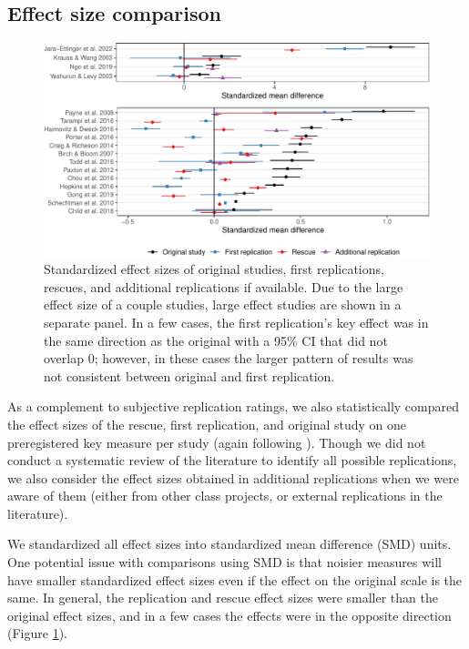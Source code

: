 \documentclass[
  english,
  a4paper,
]{article}
\begin{document}
\subsection{Effect size comparison}\label{effect-size-comparison}

\begin{figure}
\includegraphics[width=1\linewidth]{manuscript_files/figure-latex/smd-1} \caption{Standardized effect sizes of original studies, first replications, rescues, and additional replications if available. Due to the large effect size of a couple studies, large effect studies are shown in a separate panel. In a few cases, the first replication's key effect was in the same direction as the original with a 95\% CI that did not overlap 0; however, in these cases the larger pattern of results was not consistent between original and first replication.  }\label{fig:smd}
\end{figure}

As a complement to subjective replication ratings, we also statistically compared the effect sizes of the rescue, first replication, and original study on one preregistered key measure per study (again following ).
Though we did not conduct a systematic review of the literature to identify all possible replications, we also consider the effect sizes obtained in additional replications when we were aware of them (either from other class projects, or external replications in the literature).

We standardized all effect sizes into standardized mean difference (SMD) units.
One potential issue with comparisons using SMD is that noisier measures will have smaller standardized effect sizes even if the effect on the original scale is the same.
In general, the replication and rescue effect sizes were smaller than the original effect sizes, and in a few cases the effects were in the opposite direction (Figure \ref{fig:smd}).
\end{document}
